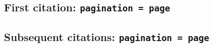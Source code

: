 \documentclass[a4paper]{article}
\begin{document}
\cite{anderson:pepaideumenos}

\cite[86]{anderson:pepaideumenos}

\AtNextCite{\renewcommand*{\volcitedelim}{\addcomma\space}}
\cite[note]{anderson:pepaideumenos}

\subsection{First citation: \texttt{pagination = page}}

\cite{anderson:pepaideumenos:a}

\citereset
\cite[86]{anderson:pepaideumenos:a}

\citereset
\cite[note]{anderson:pepaideumenos:a}

\subsection{Subsequent citations: \texttt{pagination = page}}

\cite{anderson:pepaideumenos:a}

\cite[86]{anderson:pepaideumenos:a}

\cite[note]{anderson:pepaideumenos:a}

\printbibliography
\end{document}

